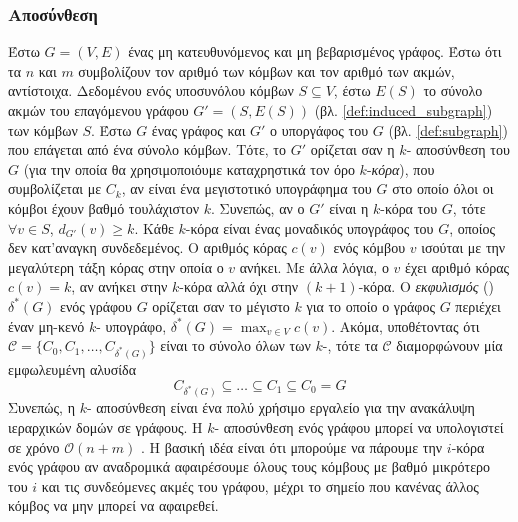 \subsubsection{ Αποσύνθεση}
Έστω $G = (V,E)$ ένας μη κατευθυνόμενος και μη βεβαρισμένος γράφος.
Έστω ότι τα $n$ και $m$ συμβολίζουν τον αριθμό των κόμβων και τον αριθμό των ακμών, αντίστοιχα.
Δεδομένου ενός υποσυνόλου κόμβων $S \subseteq V$, έστω $E(S)$ το σύνολο ακμών του επαγόμενου γράφου $G'=(S,E(S))$  (βλ. \ref{def:induced_subgraph}) των κόμβων $S$.
Έστω $G$ ένας γράφος και $G'$ ο υποργάφος του $G$ (βλ. \ref{def:subgraph}) που επάγεται από ένα σύνολο κόμβων.
Τότε, το $G'$ ορίζεται σαν η $k$- αποσύνθεση του $G$ (για την οποία θα χρησιμοποιόυμε καταχρηστικά τον όρο $k$-\textit{κόρα}), που συμβολίζεται με $C_k$, αν είναι ένα μεγιστοτικό υπογράφημα του $G$ στο οποίο όλοι οι κόμβοι έχουν βαθμό τουλάχιστον $k$.
Συνεπώς, αν ο $G'$ είναι η $k$-κόρα του $G$, τότε $\forall v \in S$, $d_{G'}(v) \geq k$.
Κάθε $k$-κόρα είναι ένας μοναδικός υπογράφος του $G$, οποίος δεν κατ'αναγκη συνδεδεμένος.
Ο αριθμός κόρας $c(v)$ ενός κόμβου $v$ ισούται με την μεγαλύτερη τάξη κόρας στην οποία ο $v$ ανήκει.
Με άλλα λόγια, ο $v$ έχει αριθμό κόρας $c(v) = k$, αν ανήκει στην $k$-κόρα αλλά όχι στην $(k+1)$-κόρα.
Ο \textit{εκφυλισμός} () $\delta^*(G)$ ενός γράφου $G$ ορίζεται σαν το μέγιστο $k$ για το οποίο ο γράφος $G$ περιέχει έναν μη-κενό $k$- υπογράφο, $\delta^*(G) = \max_{v \in V}c(v)$.
Ακόμα, υποθέτοντας ότι $\mathcal{C} = \{  C_0, C_1, \ldots, C_{\delta^*(G)} \}$ είναι το σύνολο όλων των $k$-, τότε τα $\mathcal{C}$ διαμορφώνουν μία εμφωλευμένη αλυσίδα
\begin{equation*}
    C_{\delta^*(G)} \subseteq \ldots \subseteq C_1 \subseteq C_0 = G
\end{equation*}
Συνεπώς, η $k$- αποσύνθεση είναι ένα πολύ χρήσιμο εργαλείο για την ανακάλυψη ιεραρχικών δομών σε γράφους.
Η $k$- αποσύνθεση ενός γράφου μπορεί να υπολογιστεί σε χρόνο $\mathcal{O}(n+m)$ \cite{matula1983smallest,batagelj2011fast}.
Η βασική ιδέα είναι ότι μπορούμε να πάρουμε την $i$-κόρα ενός γράφου αν αναδρομικά αφαιρέσουμε όλους τους κόμβους με βαθμό μικρότερο του $i$ και τις συνδεόμενες ακμές του γράφου, μέχρι το σημείο που κανένας άλλος κόμβος να μην μπορεί να αφαιρεθεί.

